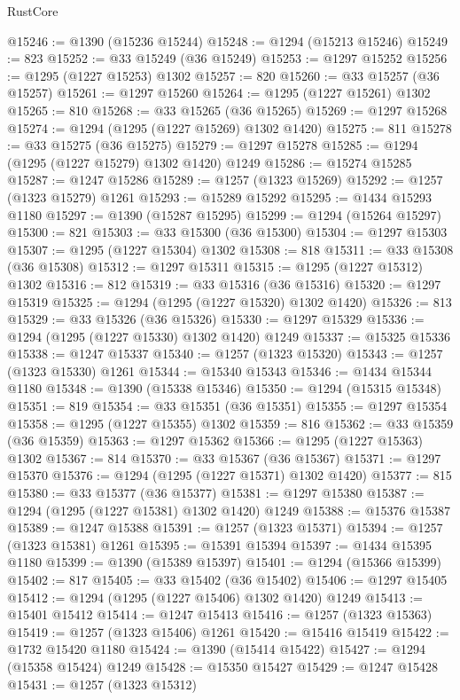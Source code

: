 \begin{lexlean}{RustCore}
\begin{coremodule}
@15246 := @1390 (@15236 @15244)
@15248 := @1294 (@15213 @15246)
@15249 := 823
@15252 := @33 @15249 (@36 @15249)
@15253 := @1297 @15252
@15256 := @1295 (@1227 @15253) @1302
@15257 := 820
@15260 := @33 @15257 (@36 @15257)
@15261 := @1297 @15260
@15264 := @1295 (@1227 @15261) @1302
@15265 := 810
@15268 := @33 @15265 (@36 @15265)
@15269 := @1297 @15268
@15274 := @1294 (@1295 (@1227 @15269) @1302 @1420)
@15275 := 811
@15278 := @33 @15275 (@36 @15275)
@15279 := @1297 @15278
@15285 := @1294 (@1295 (@1227 @15279) @1302 @1420) @1249
@15286 := @15274 @15285
@15287 := @1247 @15286
@15289 := @1257 (@1323 @15269)
@15292 := @1257 (@1323 @15279) @1261
@15293 := @15289 @15292
@15295 := @1434 @15293 @1180
@15297 := @1390 (@15287 @15295)
@15299 := @1294 (@15264 @15297)
@15300 := 821
@15303 := @33 @15300 (@36 @15300)
@15304 := @1297 @15303
@15307 := @1295 (@1227 @15304) @1302
@15308 := 818
@15311 := @33 @15308 (@36 @15308)
@15312 := @1297 @15311
@15315 := @1295 (@1227 @15312) @1302
@15316 := 812
@15319 := @33 @15316 (@36 @15316)
@15320 := @1297 @15319
@15325 := @1294 (@1295 (@1227 @15320) @1302 @1420)
@15326 := 813
@15329 := @33 @15326 (@36 @15326)
@15330 := @1297 @15329
@15336 := @1294 (@1295 (@1227 @15330) @1302 @1420) @1249
@15337 := @15325 @15336
@15338 := @1247 @15337
@15340 := @1257 (@1323 @15320)
@15343 := @1257 (@1323 @15330) @1261
@15344 := @15340 @15343
@15346 := @1434 @15344 @1180
@15348 := @1390 (@15338 @15346)
@15350 := @1294 (@15315 @15348)
@15351 := 819
@15354 := @33 @15351 (@36 @15351)
@15355 := @1297 @15354
@15358 := @1295 (@1227 @15355) @1302
@15359 := 816
@15362 := @33 @15359 (@36 @15359)
@15363 := @1297 @15362
@15366 := @1295 (@1227 @15363) @1302
@15367 := 814
@15370 := @33 @15367 (@36 @15367)
@15371 := @1297 @15370
@15376 := @1294 (@1295 (@1227 @15371) @1302 @1420)
@15377 := 815
@15380 := @33 @15377 (@36 @15377)
@15381 := @1297 @15380
@15387 := @1294 (@1295 (@1227 @15381) @1302 @1420) @1249
@15388 := @15376 @15387
@15389 := @1247 @15388
@15391 := @1257 (@1323 @15371)
@15394 := @1257 (@1323 @15381) @1261
@15395 := @15391 @15394
@15397 := @1434 @15395 @1180
@15399 := @1390 (@15389 @15397)
@15401 := @1294 (@15366 @15399)
@15402 := 817
@15405 := @33 @15402 (@36 @15402)
@15406 := @1297 @15405
@15412 := @1294 (@1295 (@1227 @15406) @1302 @1420) @1249
@15413 := @15401 @15412
@15414 := @1247 @15413
@15416 := @1257 (@1323 @15363)
@15419 := @1257 (@1323 @15406) @1261
@15420 := @15416 @15419
@15422 := @1732 @15420 @1180
@15424 := @1390 (@15414 @15422)
@15427 := @1294 (@15358 @15424) @1249
@15428 := @15350 @15427
@15429 := @1247 @15428
@15431 := @1257 (@1323 @15312)

\end{coremodule}
\end{lexlean}
